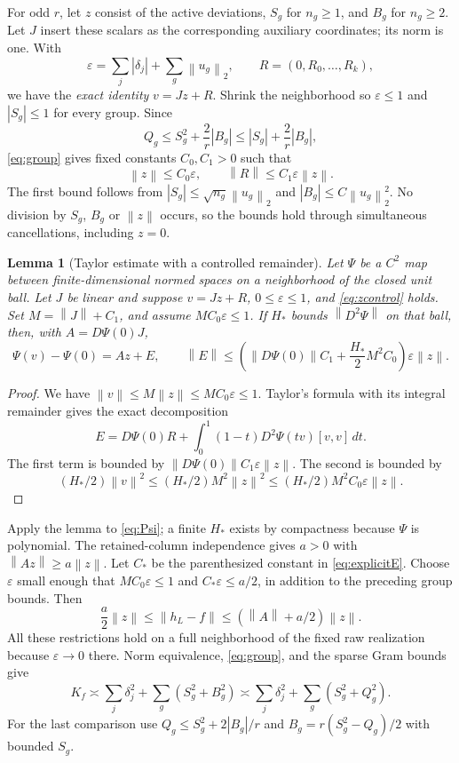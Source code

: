 \documentclass[11pt,letterpaper]{amsart}
\theoremstyle{scplain}
\newtheorem{lemma}{Lemma}[section]
\newcommand{\asym}{\asymp}
\newcommand{\norm}[1]{\left\lVert#1\right\rVert}
\begin{document}
For odd $r$, let $z$ consist of the active deviations, $S_g$ for $n_g\ge1$, and $B_g$ for $n_g\ge2$. Let $J$ insert these scalars as the corresponding auxiliary coordinates; its norm is one. With
\[
 \varepsilon=\sum_j|\delta_j|+\sum_g\norm{u_g}_2,\qquad
 R=(0,R_0,\ldots,R_k),
\]
we have the \emph{exact identity} $v=Jz+R$. Shrink the neighborhood so $\varepsilon\le1$ and $|S_g|\le1$ for every group. Since
\[
 Q_g\le S_g^2+\frac2r|B_g|\le |S_g|+\frac2r|B_g|,
\]
\eqref{eq:group} gives fixed constants $C_0,C_1>0$ such that
\begin{equation}\label{eq:zcontrol}
 \norm{z}\le C_0\varepsilon,\qquad \norm{R}\le C_1\varepsilon\norm{z}.
\end{equation}
The first bound follows from $|S_g|\le\sqrt{n_g}\norm{u_g}_2$ and $|B_g|\le C\norm{u_g}_2^2$. No division by $S_g$, $B_g$ or $\norm{z}$ occurs, so the bounds hold through simultaneous cancellations, including $z=0$.

\begin{lemma}[Taylor estimate with a controlled remainder]\label{lem:remainder}
Let $\Psi$ be a $C^2$ map between finite-dimensional normed spaces on a neighborhood of the closed unit ball. Let $J$ be linear and suppose $v=Jz+R$, $0\le\varepsilon\le1$, and \eqref{eq:zcontrol} holds. Set $M=\norm{J}+C_1$, and assume $MC_0\varepsilon\le1$. If $H_*$ bounds $\norm{D^2\Psi}$ on that ball, then, with $A=D\Psi(0)J$,
\begin{equation}\label{eq:explicitE}
 \Psi(v)-\Psi(0)=Az+E,\qquad
 \norm{E}\le\left(\norm{D\Psi(0)}C_1+\frac {H_*}2 M^2C_0\right)\varepsilon\norm{z}.
\end{equation}
\end{lemma}
\begin{proof}
We have $\norm{v}\le M\norm{z}\le MC_0\varepsilon\le1$. Taylor's formula with its integral remainder gives the exact decomposition
\[
 E=D\Psi(0)R+\int_0^1(1-t)D^2\Psi(tv)[v,v]\,dt.
\]
The first term is bounded by $\norm{D\Psi(0)}C_1\varepsilon\norm{z}$. The second is bounded by
\[
 (H_*/2)\norm{v}^2\le(H_*/2)M^2\norm{z}^2\le(H_*/2)M^2C_0\varepsilon\norm{z}.
\]
\end{proof}

Apply the lemma to \eqref{eq:Psi}; a finite $H_*$ exists by compactness because $\Psi$ is polynomial. The retained-column independence gives $a>0$ with $\norm{Az}\ge a\norm{z}$. Let $C_*$ be the parenthesized constant in \eqref{eq:explicitE}. Choose $\varepsilon$ small enough that $MC_0\varepsilon\le1$ and $C_*\varepsilon\le a/2$, in addition to the preceding group bounds. Then
\[
 \frac a2\norm{z}\le\norm{h_L-f}\le(\norm{A}+a/2)\norm{z}.
\]
All these restrictions hold on a full neighborhood of the fixed raw realization because $\varepsilon\to0$ there. Norm equivalence, \eqref{eq:group}, and the sparse Gram bounds give
\[
 K_f\asym\sum_j\delta_j^2+\sum_g(S_g^2+B_g^2)
 \asym\sum_j\delta_j^2+\sum_g(S_g^2+Q_g^2).
\]
For the last comparison use $Q_g\le S_g^2+2|B_g|/r$ and $B_g=r(S_g^2-Q_g)/2$ with bounded $S_g$.
\end{document}
